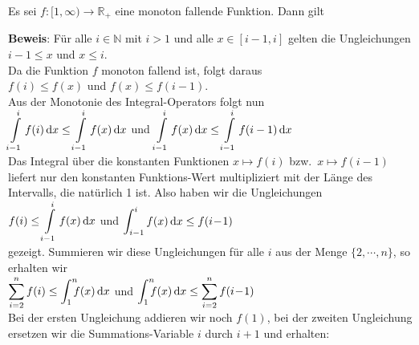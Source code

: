 \begin{Satz}
Es sei $f:[1,\infty) \rightarrow\mathbb{R}_+$ eine monoton fallende Funktion.  Dann gilt
\\[0.2cm]
\hspace*{1.3cm}
\colorbox{red}{\colorbox{orange}{}}
\end{Satz}

\noindent
\textbf{Beweis}:
F\"ur alle $i\in \mathbb{N}$ mit $i>1$ und alle $x \in [i-1,i]$ gelten die Ungleichungen
\\[0.2cm]
\hspace*{1.3cm}
$i-1 \leq x$ \quad und \quad $x \leq i$.
\\[0.2cm]
Da die Funktion $f$ monoton fallend ist, folgt daraus
\\[0.2cm]
\hspace*{1.3cm}
$f(i) \leq f(x)$ \quad und \quad $f(x) \leq f(i-1)$.
\\[0.2cm]
Aus der Monotonie des Integral-Operators folgt nun
\\[0.2cm]
\hspace*{1.3cm}
$\displaystyle\int\limits_{i-1}^{i} f(i)\, \textrm{d} x \leq \int\limits_{i-1}^{i} f(x)\, \textrm{d} x$
\quad und \quad
$\displaystyle \int\limits_{i-1}^i f(x)\, \textrm{d} x \leq \int\limits_{i-1}^i f(i-1)\, \textrm{d} x$
\\[0.2cm]
Das Integral \"uber die konstanten Funktionen $x \mapsto f(i)$ bzw.~$x \mapsto f(i-1)$
liefert nur den konstanten Funktions-Wert multipliziert mit der L\"ange des Intervalls, die nat\"urlich 1
ist.  Also haben wir die Ungleichungen
\\[0.2cm]
\hspace*{1.3cm}
$\displaystyle f(i) \leq \int\limits_{i-1}^{i} f(x)\, \textrm{d} x$
\quad und \quad
$\displaystyle\int_{i-1}^{i} f(x)\, \textrm{d} x \leq f(i\!-\!1)$
\\[0.2cm]
gezeigt.  Summieren wir diese Ungleichungen f\"ur alle $i$ aus der Menge $\{2,\cdots,n\}$,
  so erhalten wir 
\\[0.2cm]
\hspace*{1.3cm}
$\ds\sum\limits_{i=2}^n f(i) \leq \dint{1}{n} f(x)\, \dr x$
\quad und \quad
$\dint{1}{n} f(x)\, \dr x \leq \sum\limits_{i=2}^n f(i\!-\!1)$
\\[0.2cm]
Bei der ersten Ungleichung addieren wir noch $f(1)$, bei der zweiten Ungleichung ersetzen
wir die Summations-Variable $i$ durch $i+1$ und erhalten:
